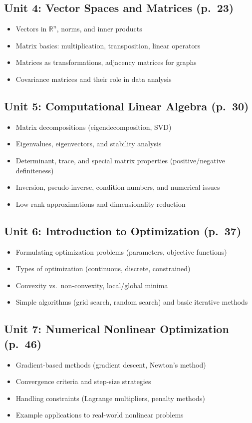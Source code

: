 \documentclass{article}
\begin{document}
\subsection*{Unit 4: Vector Spaces and Matrices (p.~23)}
\begin{itemize}
    \item Vectors in $\mathbb{R}^n$, norms, and inner products
    \item Matrix basics: multiplication, transposition, linear operators
    \item Matrices as transformations, adjacency matrices for graphs
    \item Covariance matrices and their role in data analysis
\end{itemize}

\subsection*{Unit 5: Computational Linear Algebra (p.~30)}
\begin{itemize}
    \item Matrix decompositions (eigendecomposition, SVD)
    \item Eigenvalues, eigenvectors, and stability analysis
    \item Determinant, trace, and special matrix properties (positive/negative definiteness)
    \item Inversion, pseudo-inverse, condition numbers, and numerical issues
    \item Low-rank approximations and dimensionality reduction
\end{itemize}

\subsection*{Unit 6: Introduction to Optimization (p.~37)}
\begin{itemize}
    \item Formulating optimization problems (parameters, objective functions)
    \item Types of optimization (continuous, discrete, constrained)
    \item Convexity vs.\ non-convexity, local/global minima
    \item Simple algorithms (grid search, random search) and basic iterative methods
\end{itemize}

\subsection*{Unit 7: Numerical Nonlinear Optimization (p.~46)}
\begin{itemize}
    \item Gradient-based methods (gradient descent, Newton’s method)
    \item Convergence criteria and step-size strategies
    \item Handling constraints (Lagrange multipliers, penalty methods)
    \item Example applications to real-world nonlinear problems
\end{itemize}
\end{document}
